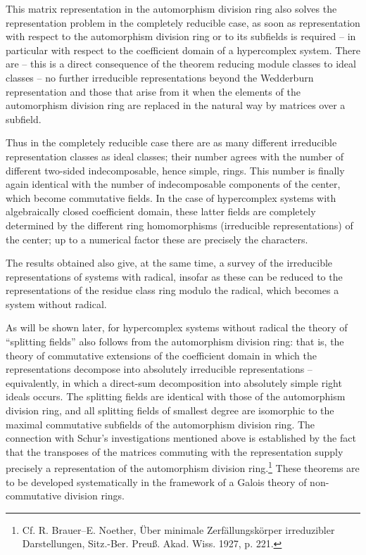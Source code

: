 \documentclass[11pt]{article}
\begin{document}
This matrix representation in the automorphism division ring also solves the representation problem in the completely reducible case, as soon as representation with respect to the automorphism division ring or to its subfields is required -- in particular with respect to the coefficient domain of a hypercomplex system. There are -- this is a direct consequence of the theorem reducing module classes to ideal classes -- no further irreducible representations beyond the Wedderburn representation and those that arise from it when the elements of the automorphism division ring are replaced in the natural way by matrices over a subfield.

Thus in the completely reducible case there are as many different irreducible representation classes as ideal classes; their number agrees with the number of different two-sided indecomposable, hence simple, rings. This number is finally again identical with the number of indecomposable components of the center, which become commutative fields. In the case of hypercomplex systems with algebraically closed coefficient domain, these latter fields are completely determined by the different ring homomorphisms (irreducible representations) of the center; up to a numerical factor these are precisely the characters.

The results obtained also give, at the same time, a survey of the irreducible representations of systems with radical, insofar as these can be reduced to the representations of the residue class ring modulo the radical, which becomes a system without radical.

As will be shown later, for hypercomplex systems without radical the theory of ``splitting fields'' also follows from the automorphism division ring: that is, the theory of commutative extensions of the coefficient domain in which the representations decompose into absolutely irreducible representations -- equivalently, in which a direct-sum decomposition into absolutely simple right ideals occurs. The splitting fields are identical with those of the automorphism division ring, and all splitting fields of smallest degree are isomorphic to the maximal commutative subfields of the automorphism division ring. The connection with Schur's investigations mentioned above is established by the fact that the transposes of the matrices commuting with the representation supply precisely a representation of the automorphism division ring.\footnote{Cf. R. Brauer--E. Noether, Über minimale Zerfällungskörper irreduzibler Darstellungen, Sitz.-Ber. Preuß. Akad. Wiss. 1927, p. 221.} These theorems are to be developed systematically in the framework of a Galois theory of non-commutative division rings.
\end{document}

